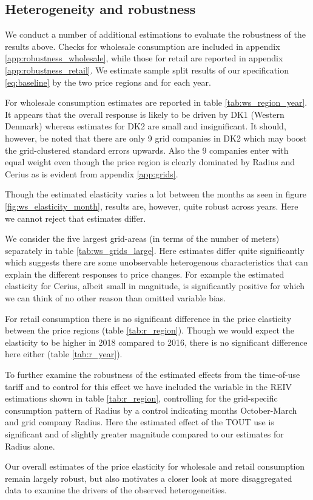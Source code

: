 \subsection{Heterogeneity and robustness}
\label{subsec:r_robustness}
We conduct a number of additional estimations to evaluate the robustness of the results above. Checks for wholesale consumption are included in appendix \ref{app:robustness_wholesale}, while those for retail are reported in appendix \ref{app:robustness_retail}. We estimate sample split results of our specification \eqref{eq:baseline} by the two price regions and for each year.
\bigskip\par
For wholesale consumption estimates are reported in table \ref{tab:ws_region_year}. It appears that the overall response is likely to be driven by DK1 (Western Denmark) whereas estimates for DK2 are small and insignificant. It should, however, be noted that there are only 9 grid companies in DK2 which may boost the grid-clustered standard errors upwards. Also the 9 companies enter with equal weight even though the price region is clearly dominated by Radius and Cerius as is evident from appendix \ref{app:grids}.
\par
Though the estimated elasticity varies a lot between the months as seen in figure \ref{fig:ws_elasticity_month}, results are, however, quite robust across years. Here we cannot reject that estimates differ.
\par
We consider the five largest grid-areas (in terms of the number of meters) separately in table \ref{tab:ws_grids_large}. Here estimates differ quite significantly which suggests there are some unobservable heterogenous characteristics that can explain the different responses to price changes. For example the estimated elasticity for Cerius, albeit small in magnitude, is significantly positive for which we can think of no other reason than omitted variable bias.
\bigskip\par
For retail consumption there is no significant difference in the price elasticity between the price regions (table \ref{tab:r_region}). Though we would expect the elasticity to be higher in 2018 compared to 2016, there is no significant difference here either (table \ref{tab:r_year}).
\par
To further examine the robustness of the estimated effects from the time-of-use tariff and to control for this effect we have included the variable in the REIV estimations shown in table \ref{tab:r_region}, controlling for the grid-specific consumption pattern of Radius by a control indicating months October-March and grid company Radius. Here the estimated effect of the TOUT use is significant and of slightly greater magnitude compared to our estimates for Radius alone.
\bigskip\par
Our overall estimates of the price elasticity for wholesale and retail consumption remain largely robust, but also motivates a closer look at more disaggregated data to examine the drivers of the observed heterogeneities.
\par

